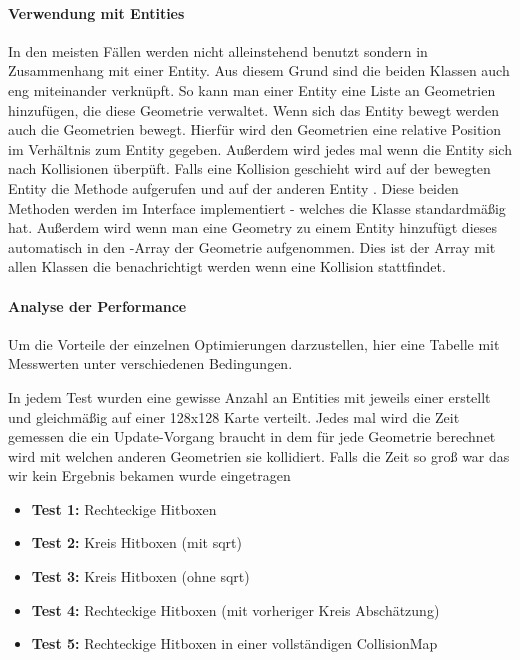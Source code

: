\paragraph{Verwendung mit Entities}

In den meisten Fällen werden  nicht alleinstehend benutzt sondern in Zusammenhang mit einer Entity. Aus diesem Grund sind die beiden Klassen auch eng miteinander verknüpft. So kann man einer Entity eine Liste an Geometrien hinzufügen, die diese Geometrie verwaltet. Wenn sich das Entity bewegt werden auch die Geometrien bewegt. Hierfür wird den Geometrien eine relative Position im Verhältnis zum Entity gegeben.
Außerdem wird jedes mal wenn die Entity sich  nach Kollisionen überpüft. Falls eine Kollision geschieht wird auf der bewegten Entity die Methode  aufgerufen und auf der anderen Entity . Diese beiden Methoden werden im Interface  implementiert - welches die Klasse  standardmäßig hat. Außerdem wird wenn man eine Geometry zu einem Entity hinzufügt dieses automatisch in den -Array der Geometrie aufgenommen. Dies ist der Array mit allen Klassen die benachrichtigt werden wenn eine Kollision stattfindet.

\paragraph{Analyse der Performance}

Um die Vorteile der einzelnen Optimierungen darzustellen, hier eine Tabelle mit Messwerten unter verschiedenen Bedingungen.

In jedem Test wurden eine gewisse Anzahl an Entities mit jeweils einer  erstellt und gleichmäßig auf einer 128x128 Karte verteilt.
Jedes mal wird die Zeit gemessen die ein Update-Vorgang braucht in dem für jede Geometrie berechnet wird mit welchen anderen Geometrien sie kollidiert. Falls die Zeit so groß war das wir kein Ergebnis bekamen wurde  eingetragen

\begin{itemize}
\item{\bf{Test 1}:} Rechteckige Hitboxen
\item{\bf{Test 2}:} Kreis Hitboxen (mit sqrt)
\item{\bf{Test 3}:} Kreis Hitboxen (ohne sqrt) 
\item{\bf{Test 4}:} Rechteckige Hitboxen (mit vorheriger Kreis Abschätzung)
\item{\bf{Test 5}:} Rechteckige Hitboxen in einer vollständigen CollisionMap 
\end{itemize}



